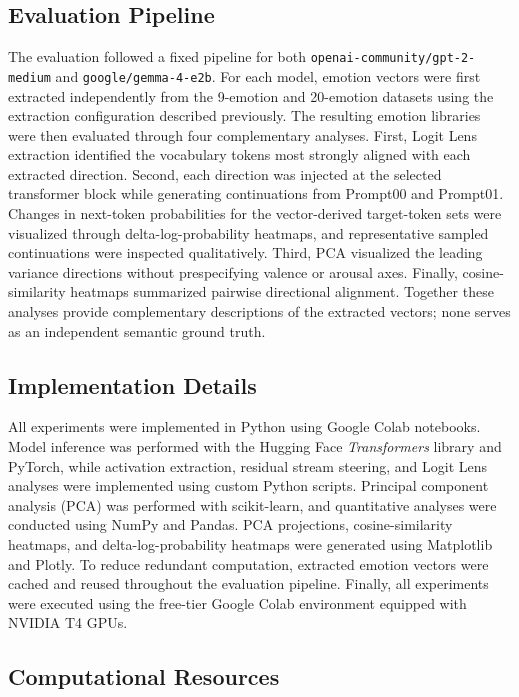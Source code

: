 \subsection{Evaluation Pipeline}

The evaluation followed a fixed pipeline for both \texttt{openai-community/gpt-2-medium} and \texttt{google/gemma-4-e2b}. For each
model, emotion vectors were first extracted independently from the 9-emotion and 20-emotion datasets using the extraction 
configuration described previously. The resulting emotion libraries were then evaluated through four complementary analyses. First,
Logit Lens extraction identified the vocabulary tokens most strongly aligned with each extracted direction. Second,
each direction was injected at the selected transformer block while generating continuations from Prompt00 and Prompt01. Changes in
next-token probabilities for the vector-derived target-token sets were visualized through delta-log-probability heatmaps, and representative
sampled continuations were inspected qualitatively. Third, PCA visualized the leading variance directions without prespecifying valence or
arousal axes. Finally, cosine-similarity heatmaps summarized pairwise directional alignment. Together these analyses provide complementary
descriptions of the extracted vectors; none serves as an independent semantic ground truth.

\subsection{Implementation Details}

All experiments were implemented in Python using Google Colab notebooks. Model inference was performed with the Hugging Face
\emph{Transformers} library and PyTorch, while activation extraction, residual stream steering, and Logit Lens analyses were
implemented using custom Python scripts. Principal component analysis (PCA) was performed with scikit-learn, and quantitative
analyses were conducted using NumPy and Pandas. PCA projections, cosine-similarity heatmaps, and delta-log-probability heatmaps
were generated using Matplotlib and Plotly. To reduce redundant computation, extracted emotion vectors
were cached and reused throughout the evaluation pipeline. Finally, all experiments were executed using the free-tier Google Colab
environment equipped with NVIDIA T4 GPUs.

\subsection{Computational Resources}

